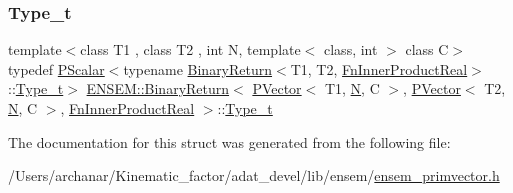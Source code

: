 \subsubsection{\texorpdfstring{Type\_t}{Type\_t}\hspace{0.1cm}{\footnotesize\ttfamily [2/2]}}
{\footnotesize\ttfamily template$<$class T1 , class T2 , int N, template$<$ class, int $>$ class C$>$ \\
typedef \mbox{\hyperlink{classENSEM_1_1PScalar}{P\+Scalar}}$<$typename \mbox{\hyperlink{structENSEM_1_1BinaryReturn}{Binary\+Return}}$<$T1, T2, \mbox{\hyperlink{structENSEM_1_1FnInnerProductReal}{Fn\+Inner\+Product\+Real}}$>$\+::\mbox{\hyperlink{structENSEM_1_1BinaryReturn_3_01PVector_3_01T1_00_01N_00_01C_01_4_00_01PVector_3_01T2_00_01N_00_468475cad5ee6c317874aa2dbdb6c752_a90d242abe1e521e266bcd13cbaf17e35}{Type\+\_\+t}}$>$ \mbox{\hyperlink{structENSEM_1_1BinaryReturn}{E\+N\+S\+E\+M\+::\+Binary\+Return}}$<$ \mbox{\hyperlink{classENSEM_1_1PVector}{P\+Vector}}$<$ T1, \mbox{\hyperlink{operator__name__util_8cc_a7722c8ecbb62d99aee7ce68b1752f337}{N}}, C $>$, \mbox{\hyperlink{classENSEM_1_1PVector}{P\+Vector}}$<$ T2, \mbox{\hyperlink{operator__name__util_8cc_a7722c8ecbb62d99aee7ce68b1752f337}{N}}, C $>$, \mbox{\hyperlink{structENSEM_1_1FnInnerProductReal}{Fn\+Inner\+Product\+Real}} $>$\+::\mbox{\hyperlink{structENSEM_1_1BinaryReturn_3_01PVector_3_01T1_00_01N_00_01C_01_4_00_01PVector_3_01T2_00_01N_00_468475cad5ee6c317874aa2dbdb6c752_a90d242abe1e521e266bcd13cbaf17e35}{Type\+\_\+t}}}



The documentation for this struct was generated from the following file\+:\begin{DoxyCompactItemize}
\item 
/\+Users/archanar/\+Kinematic\+\_\+factor/adat\+\_\+devel/lib/ensem/\mbox{\hyperlink{lib_2ensem_2ensem__primvector_8h}{ensem\+\_\+primvector.\+h}}\end{DoxyCompactItemize}
